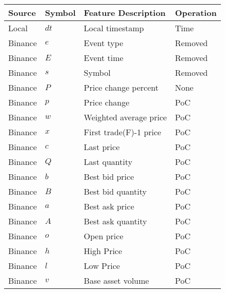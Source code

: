 \begin{table}
    \centering
    \begin{tabular}{|l|l|l|l|}
    \hline
            Source          & Symbol        & Feature Description           & Operation \\\hline
            Local           & $dt$          & Local timestamp               & Time      \\
            Binance         & $e$           & Event type                    & Removed   \\
            Binance         & $E$           & Event time                    & Removed   \\
            Binance         & $s$           & Symbol                        & Removed   \\
            Binance         & $P$           & Price change percent          & None      \\
            Binance         & $p$           & Price change                  & PoC       \\
            Binance         & $w$           & Weighted average price        & PoC       \\
            Binance         & $x$           & First trade(F)-1 price        & PoC       \\
            Binance         & $c$           & Last price                    & PoC       \\
            Binance         & $Q$           & Last quantity                 & PoC       \\
            Binance         & $b$           & Best bid price                & PoC       \\
            Binance         & $B$           & Best bid quantity             & PoC       \\
            Binance         & $a$           & Best ask price                & PoC       \\
            Binance         & $A$           & Best ask quantity             & PoC       \\
            Binance         & $o$           & Open price                    & PoC       \\
            Binance         & $h$           & High Price                    & PoC       \\
            Binance         & $l$           & Low Price                     & PoC       \\
            Binance         & $v$           & Base asset volume             & PoC       \\

\end{tabular}
\end{table}

